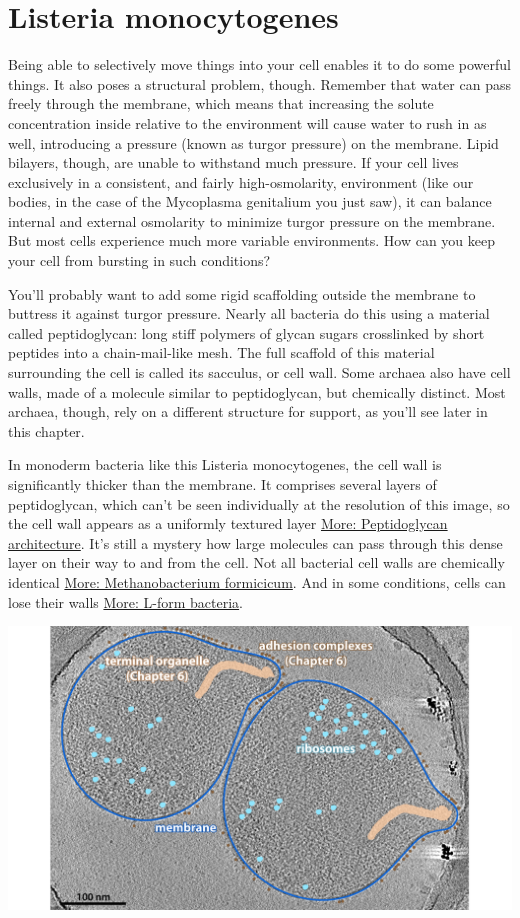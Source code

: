 \documentclass[]{tufte-book}
\begin{document}
\section{Listeria monocytogenes}\label{listeria-monocytogenes}

Being able to selectively move things into your cell enables it to do
some powerful things. It also poses a structural problem, though.
Remember that water can pass freely through the membrane, which means
that increasing the solute concentration inside relative to the
environment will cause water to rush in as well, introducing a pressure
(known as turgor pressure) on the membrane. Lipid bilayers, though, are
unable to withstand much pressure. If your cell lives exclusively in a
consistent, and fairly high-osmolarity, environment (like our bodies, in
the case of the Mycoplasma genitalium you just saw), it can balance
internal and external osmolarity to minimize turgor pressure on the
membrane. But most cells experience much more variable environments. How
can you keep your cell from bursting in such conditions?

You'll probably want to add some rigid scaffolding outside the membrane
to buttress it against turgor pressure. Nearly all bacteria do this
using a material called peptidoglycan: long stiff polymers of glycan
sugars crosslinked by short peptides into a chain-mail-like mesh. The
full scaffold of this material surrounding the cell is called its
sacculus, or cell wall. Some archaea also have cell walls, made of a
molecule similar to peptidoglycan, but chemically distinct. Most
archaea, though, rely on a different structure for support, as you'll
see later in this chapter.

In monoderm bacteria like this Listeria monocytogenes, the cell wall is
significantly thicker than the membrane. It comprises several layers of
peptidoglycan, which can't be seen individually at the resolution of
this image, so the cell wall appears as a uniformly textured layer
\protect\hyperlink{Peptidoglycan_architecture}{More: Peptidoglycan
architecture}. It's still a mystery how large molecules can pass through
this dense layer on their way to and from the cell. Not all bacterial
cell walls are chemically identical \protect\hyperlink{}{More:
Methanobacterium formicicum}. And in some conditions, cells can lose
their walls \protect\hyperlink{}{More: L-form bacteria}.

\includegraphics{img/02_static/2_1_Mgenitalium}
\end{document}
